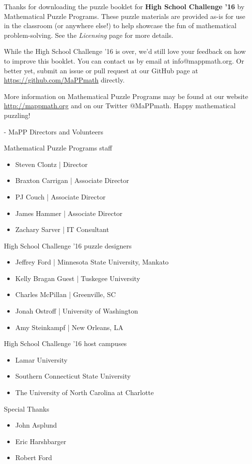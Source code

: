 
\begin{about}
Thanks for downloading the puzzle booklet for
\textbf{High School Challenge '16} by Mathematical Puzzle Programs.
These puzzle materials are provided as-is for use in the classroom
(or anywhere else!)
to help showcase the fun of mathematical problem-solving. See the
\textit{Licensing} page for more details.

While the High School Challenge '16 is over,
we'd still love your feedback on how to improve this booklet. You can
contact us by email at info@mappmath.org. Or better yet,
submit an issue or pull request at our GitHub page at
\url{https://github.com/MaPPmath}
directly.

More information on Mathematical Puzzle Programs may be found at our website
\url{http://mappmath.org} and on our Twitter @MaPPmath. Happy mathematical puzzling!

- MaPP Directors and Volunteers
\end{about}


\begin{credits}
Mathematical Puzzle Programs staff
  \begin{itemize}
    \item Steven Clontz | Director
    \item Braxton Carrigan | Associate Director
    \item PJ Couch | Associate Director
    \item James Hammer | Associate Director
    \item Zachary Sarver | IT Consultant
  \end{itemize}

\noindent
High School Challenge '16 puzzle designers
  \begin{itemize}
    \item Jeffrey Ford | Minnesota State University, Mankato
    \item Kelly Bragan Guest | Tuskegee University
    \item Charles McPillan | Greenville, SC
    \item Jonah Ostroff | University of Washington
    \item Amy Steinkampf | New Orleans, LA
  \end{itemize}

\noindent
High School Challenge '16 host campuses
  \begin{itemize}
    \item Lamar University
    \item Southern Connecticut State University
    \item The University of North Carolina at Charlotte
  \end{itemize}

\noindent
Special Thanks
\begin{itemize}
  \item John Asplund
  \item Eric Harshbarger
  \item Robert Ford
\end{itemize}

\end{credits}

